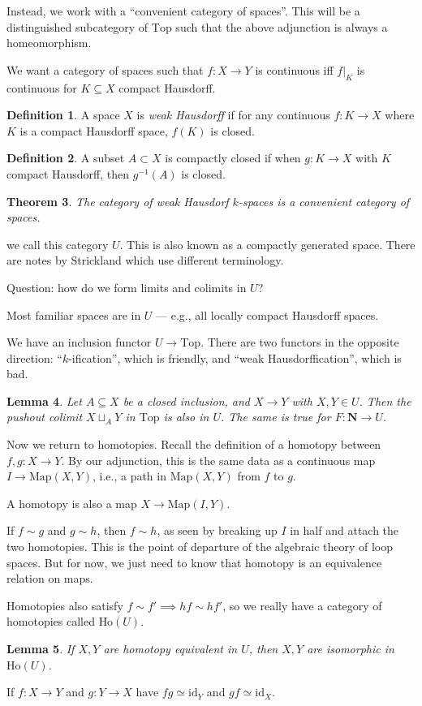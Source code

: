 \documentclass[10pt]{article}
\newtheorem{theorem}{Theorem}[section]
\newtheorem{lemma}[theorem]{Lemma}
\theoremstyle{definition}
\newtheorem{definition}[theorem]{Definition}
\begin{document}
	Instead, we work with a ``convenient category of spaces''. This will be a distinguished subcategory of $\text{Top}$ such that the above adjunction is always a homeomorphism.
	
	We want a category of spaces such that $f:X\to Y$ is continuous iff $f|_{K}$ is continuous for $K\subseteq X$ compact Hausdorff.  
	\begin{definition}
		A space $X$ is \emph{weak Hausdorff} if for any continuous $f:K\to X$ where $K$ is a compact Hausdorff space, $f(K)$ is closed. 
	\end{definition}
	\begin{definition}
		A subset $A\subset X$ is compactly closed if when $g:K\to X$ with $K$ compact Hausdorff, then $g^{-1}(A)$ is closed. 
	\end{definition}
	\begin{theorem}
		The category of weak Hausdorf $k$-spaces is a convenient category of spaces.
	\end{theorem}
	we call this category $U$. This is also known as a compactly generated space. There are notes by Strickland which use different terminology. 
	
	Question: how do we form limits and colimits in $U$? 
	
	Most familiar spaces are in $U$ --- e.g., all locally compact Hausdorff spaces. 
	
	We have an inclusion functor $U\to\text{Top}$. There are two functors in the opposite direction: ``$k$-ification'', which is friendly, and ``weak Hausdorffication'', which is bad. 
	\begin{lemma}
		Let $A\subseteq X$ be a closed inclusion, and $X\to Y$ with $X,Y\in U$. Then the pushout colimit $X\sqcup_{A}Y$ in $\text{Top}$ is also in $U$. The same is true for $F:\mathbf{N}\to U$. 
	\end{lemma} 
	Now we return to homotopies. Recall the definition of a homotopy between $f,g:X\to Y$. By our adjunction, this is the same data as a continuous map $I\to\text{Map}(X,Y) $, i.e., a path in $\text{Map}(X,Y)$ from $f$ to $g$. 
	
	A homotopy is also a map $X\to\text{Map}(I,Y)$. 
	
	If $f\sim g$ and $g\sim h$, then $f\sim h$, as seen by breaking up $I$ in half and attach the two homotopies. This is the point of departure of the algebraic theory of loop spaces. But for now, we just need to know that homotopy is an equivalence relation on maps. 
	
	Homotopies also satisfy $f\sim f'\implies hf\sim hf'$, so we really have a category of homotopies called $\text{Ho}(U)$. 
	\begin{lemma}
		If $X,Y$ are homotopy equivalent in $U$, then $X,Y$ are isomorphic in $\text{Ho}(U)$. 
	\end{lemma}
	If $f:X\to Y$ and $g:Y\to X$ have $fg\simeq\text{id}_{Y}$ and $gf\simeq\text{id}_{X}$. 
	
\end{document}

